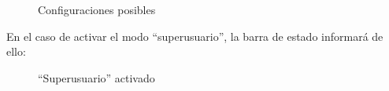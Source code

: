 \begin{figure} [!htb]
	\centering
	\caption{Configuraciones posibles}
	\label{fig:configuracionesPosibles}
\end{figure}

En el caso de activar el modo ``superusuario'', la barra de estado informará de ello:

\begin{figure} [!htb]
	\centering
	\caption{``Superusuario'' activado}
	\label{fig:superusuarioActivado}
\end{figure}

